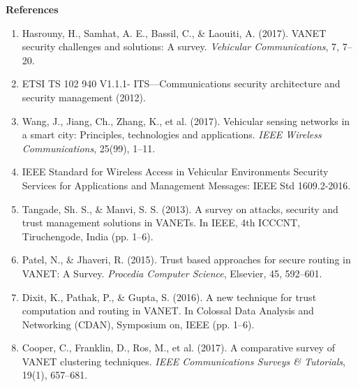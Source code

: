 \documentclass[a4paper,14pt]{extarticle}
\begin{document}
\newpage
\begin{center}
    {\LARGE \textbf{References}} \\
    \vspace{1cm}
\end{center}
\begin{enumerate}
    \item Hasrouny, H., Samhat, A. E., Bassil, C., \& Laouiti, A. (2017). VANET security challenges and solutions: A survey. \textit{Vehicular Communications}, 7, 7–20.
    
    \item ETSI TS 102 940 V1.1.1- ITS—Communications security architecture and security management (2012).
    
    \item Wang, J., Jiang, Ch., Zhang, K., et al. (2017). Vehicular sensing networks in a smart city: Principles, technologies and applications. \textit{IEEE Wireless Communications}, 25(99), 1–11.
    
    \item IEEE Standard for Wireless Access in Vehicular Environments Security Services for Applications and Management Messages: IEEE Std 1609.2-2016.
    
    \item Tangade, Sh. S., \& Manvi, S. S. (2013). A survey on attacks, security and trust management solutions in VANETs. In IEEE, 4th ICCCNT, Tiruchengode, India (pp. 1–6).
    
    \item Patel, N., \& Jhaveri, R. (2015). Trust based approaches for secure routing in VANET: A Survey. \textit{Procedia Computer Science}, Elsevier, 45, 592–601.
    
    \item Dixit, K., Pathak, P., \& Gupta, S. (2016). A new technique for trust computation and routing in VANET. In Colossal Data Analysis and Networking (CDAN), Symposium on, IEEE (pp. 1–6).
    
    \item Cooper, C., Franklin, D., Ros, M., et al. (2017). A comparative survey of VANET clustering techniques. \textit{IEEE Communications Surveys \& Tutorials}, 19(1), 657–681.
\end{enumerate}
\end{document}
